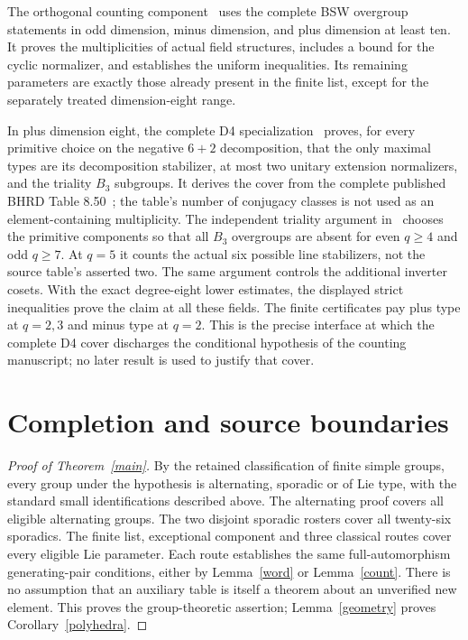 \documentclass[11pt,a4paper]{article}
\begin{document}
The orthogonal counting component~\cite{Orthogonal} uses the complete
BSW overgroup statements in odd dimension, minus dimension, and plus
dimension at least ten. It proves the multiplicities of actual field
structures, includes a bound for the cyclic normalizer, and establishes
the uniform inequalities. Its remaining parameters are exactly those
already present in the finite list, except for the separately treated
dimension-eight range.

In plus dimension eight, the complete D4 specialization~\cite{Dfour}
proves, for every primitive choice on the negative $6+2$ decomposition,
that the only maximal types are its decomposition stabilizer, at most
two unitary extension normalizers, and the triality $B_3$ subgroups.
It derives the cover from the complete published BHRD Table 8.50~\cite{BHRD};
the table's number of conjugacy classes is not used as an element-containing
multiplicity. The independent triality argument in~\cite{Orthogonal}
chooses the primitive components so that all $B_3$ overgroups are absent
for even $q\ge4$ and odd $q\ge7$. At $q=5$ it counts the actual six
possible line stabilizers, not the source table's asserted two.
The same argument controls the additional inverter cosets.
With the exact degree-eight lower estimates, the displayed strict
inequalities prove the claim at all these fields. The finite certificates
pay plus type at $q=2,3$ and minus type at $q=2$.
This is the precise interface at which the complete D4 cover discharges
the conditional hypothesis of the counting manuscript; no later result
is used to justify that cover.

\section{Completion and source boundaries}
\begin{proof}[Proof of Theorem~\ref{main}]
By the retained classification of finite simple groups, every group under
the hypothesis is alternating, sporadic or of Lie type, with the standard
small identifications described above. The alternating proof covers
all eligible alternating groups. The two disjoint sporadic rosters cover
all twenty-six sporadics. The finite list, exceptional component and
three classical routes cover every eligible Lie parameter. Each route
establishes the same full-automorphism generating-pair conditions, either
by Lemma~\ref{word} or Lemma~\ref{count}. There is no assumption that
an auxiliary table is itself a theorem about an unverified new element.
This proves the group-theoretic assertion; Lemma~\ref{geometry} proves
Corollary~\ref{polyhedra}.
\end{proof}
\end{document}
